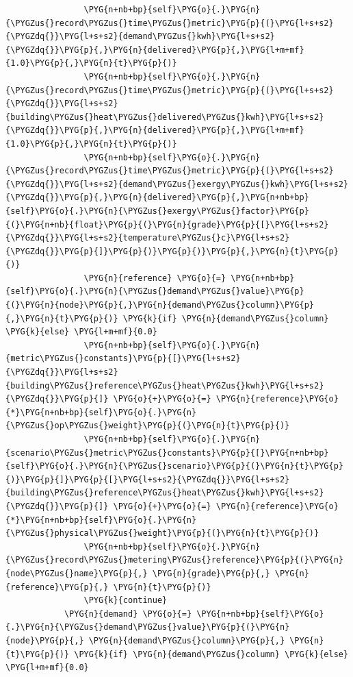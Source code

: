 \begin{Verbatim}
                \PYG{n+nb+bp}{self}\PYG{o}{.}\PYG{n}{\PYGZus{}record\PYGZus{}time\PYGZus{}metric}\PYG{p}{(}\PYG{l+s+s2}{\PYGZdq{}}\PYG{l+s+s2}{demand\PYGZus{}kwh}\PYG{l+s+s2}{\PYGZdq{}}\PYG{p}{,}\PYG{n}{delivered}\PYG{p}{,}\PYG{l+m+mf}{1.0}\PYG{p}{,}\PYG{n}{t}\PYG{p}{)}
                \PYG{n+nb+bp}{self}\PYG{o}{.}\PYG{n}{\PYGZus{}record\PYGZus{}time\PYGZus{}metric}\PYG{p}{(}\PYG{l+s+s2}{\PYGZdq{}}\PYG{l+s+s2}{building\PYGZus{}heat\PYGZus{}delivered\PYGZus{}kwh}\PYG{l+s+s2}{\PYGZdq{}}\PYG{p}{,}\PYG{n}{delivered}\PYG{p}{,}\PYG{l+m+mf}{1.0}\PYG{p}{,}\PYG{n}{t}\PYG{p}{)}
                \PYG{n+nb+bp}{self}\PYG{o}{.}\PYG{n}{\PYGZus{}record\PYGZus{}time\PYGZus{}metric}\PYG{p}{(}\PYG{l+s+s2}{\PYGZdq{}}\PYG{l+s+s2}{demand\PYGZus{}exergy\PYGZus{}kwh}\PYG{l+s+s2}{\PYGZdq{}}\PYG{p}{,}\PYG{n}{delivered}\PYG{p}{,}\PYG{n+nb+bp}{self}\PYG{o}{.}\PYG{n}{\PYGZus{}exergy\PYGZus{}factor}\PYG{p}{(}\PYG{n+nb}{float}\PYG{p}{(}\PYG{n}{grade}\PYG{p}{[}\PYG{l+s+s2}{\PYGZdq{}}\PYG{l+s+s2}{temperature\PYGZus{}c}\PYG{l+s+s2}{\PYGZdq{}}\PYG{p}{]}\PYG{p}{)}\PYG{p}{)}\PYG{p}{,}\PYG{n}{t}\PYG{p}{)}
                \PYG{n}{reference} \PYG{o}{=} \PYG{n+nb+bp}{self}\PYG{o}{.}\PYG{n}{\PYGZus{}demand\PYGZus{}value}\PYG{p}{(}\PYG{n}{node}\PYG{p}{,}\PYG{n}{demand\PYGZus{}column}\PYG{p}{,}\PYG{n}{t}\PYG{p}{)} \PYG{k}{if} \PYG{n}{demand\PYGZus{}column} \PYG{k}{else} \PYG{l+m+mf}{0.0}
                \PYG{n+nb+bp}{self}\PYG{o}{.}\PYG{n}{metric\PYGZus{}constants}\PYG{p}{[}\PYG{l+s+s2}{\PYGZdq{}}\PYG{l+s+s2}{building\PYGZus{}reference\PYGZus{}heat\PYGZus{}kwh}\PYG{l+s+s2}{\PYGZdq{}}\PYG{p}{]} \PYG{o}{+}\PYG{o}{=} \PYG{n}{reference}\PYG{o}{*}\PYG{n+nb+bp}{self}\PYG{o}{.}\PYG{n}{\PYGZus{}op\PYGZus{}weight}\PYG{p}{(}\PYG{n}{t}\PYG{p}{)}
                \PYG{n+nb+bp}{self}\PYG{o}{.}\PYG{n}{scenario\PYGZus{}metric\PYGZus{}constants}\PYG{p}{[}\PYG{n+nb+bp}{self}\PYG{o}{.}\PYG{n}{\PYGZus{}scenario}\PYG{p}{(}\PYG{n}{t}\PYG{p}{)}\PYG{p}{]}\PYG{p}{[}\PYG{l+s+s2}{\PYGZdq{}}\PYG{l+s+s2}{building\PYGZus{}reference\PYGZus{}heat\PYGZus{}kwh}\PYG{l+s+s2}{\PYGZdq{}}\PYG{p}{]} \PYG{o}{+}\PYG{o}{=} \PYG{n}{reference}\PYG{o}{*}\PYG{n+nb+bp}{self}\PYG{o}{.}\PYG{n}{\PYGZus{}physical\PYGZus{}weight}\PYG{p}{(}\PYG{n}{t}\PYG{p}{)}
                \PYG{n+nb+bp}{self}\PYG{o}{.}\PYG{n}{\PYGZus{}record\PYGZus{}metering\PYGZus{}reference}\PYG{p}{(}\PYG{n}{node\PYGZus{}name}\PYG{p}{,} \PYG{n}{grade}\PYG{p}{,} \PYG{n}{reference}\PYG{p}{,} \PYG{n}{t}\PYG{p}{)}
                \PYG{k}{continue}
            \PYG{n}{demand} \PYG{o}{=} \PYG{n+nb+bp}{self}\PYG{o}{.}\PYG{n}{\PYGZus{}demand\PYGZus{}value}\PYG{p}{(}\PYG{n}{node}\PYG{p}{,} \PYG{n}{demand\PYGZus{}column}\PYG{p}{,} \PYG{n}{t}\PYG{p}{)} \PYG{k}{if} \PYG{n}{demand\PYGZus{}column} \PYG{k}{else} \PYG{l+m+mf}{0.0}

\end{Verbatim}
